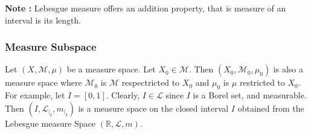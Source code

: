 	\textbf{Note : }  Lebesgue measure offers an addition property, that is measure of an interval is its length.\\

\subsubsection{Measure {\color{red}Sub}space}
	Let $(X,\mathcal{M},\mu)$ be a measure space.
	Let $X_0 \in \mathcal{M}$.
	Then $(X_0,\mathcal{M}_0,\mu_0)$ is also a measure space where $\mathcal{M}_0$ is $\mathcal{M}$ respectricted to $X_0$ and $\mu_0$ is $\mu$ restricted to $X_0$.\\

	For example, let $I = [0,1]$.
	Clearly, $I \in \mathcal{L}$ since $I$ is a Borel set, and measurable.
	Then $(I,\mathcal{L}_{|_I},m_{|_I})$ is a measure space on the closed interval $I$ obtained from the Lebesgue measure Space $(\mathbb{R},\mathcal{L},m)$.

